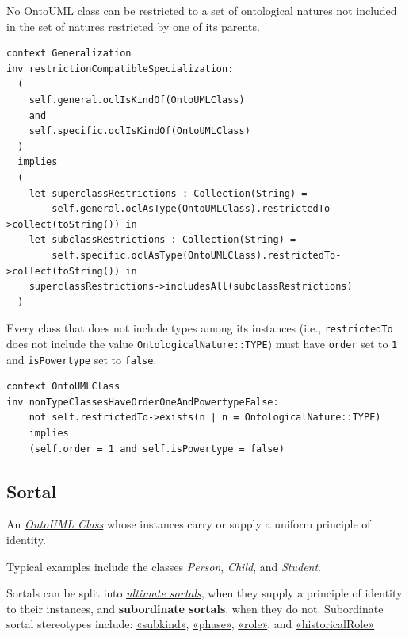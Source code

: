 \begin{constraint}
\label{restrictionCompatibleSpecialization}
No OntoUML class can be restricted to a set of ontological natures not included in the set of natures restricted by one of its parents.

\begin{lstlisting}[language=OCL]
context Generalization
inv restrictionCompatibleSpecialization:
  (
    self.general.oclIsKindOf(OntoUMLClass)
    and
    self.specific.oclIsKindOf(OntoUMLClass)
  )
  implies
  (
    let superclassRestrictions : Collection(String) = 
        self.general.oclAsType(OntoUMLClass).restrictedTo->collect(toString()) in
    let subclassRestrictions : Collection(String) = 
        self.specific.oclAsType(OntoUMLClass).restrictedTo->collect(toString()) in 
    superclassRestrictions->includesAll(subclassRestrictions)
  )
\end{lstlisting}
\end{constraint}

\begin{constraint}
\label{nonTypeClassesHaveOrderOneAndPowertypeFalse}
Every class that does not include types among its instances (i.e., \texttt{restrictedTo} does not include the value \texttt{OntologicalNature::TYPE}) must have \texttt{order} set to \texttt{1} and \texttt{isPowertype} set to \texttt{false}.

\begin{lstlisting}[language=OCL]
context OntoUMLClass
inv nonTypeClassesHaveOrderOneAndPowertypeFalse:
    not self.restrictedTo->exists(n | n = OntologicalNature::TYPE)
    implies
    (self.order = 1 and self.isPowertype = false)
\end{lstlisting}
\end{constraint}

\subsection{Sortal}
\label{stereotype:sortal}

An \hyperref[stereotype:ontoumlClass]{\textit{OntoUML Class}} whose instances carry or supply a uniform principle of identity.

Typical examples include the classes \textit{Person}, \textit{Child}, and \textit{Student}.

Sortals can be split into \hyperref[stereotype:ultimateSortal]{\textit{ultimate sortals}}, when they supply a principle of identity to their instances, and \textbf{subordinate sortals}, when they do not. Subordinate sortal stereotypes include: \hyperref[stereotype:subkind]{«subkind»}, \hyperref[stereotype:phase]{«phase»}, \hyperref[stereotype:role]{«role»}, and \hyperref[stereotype:historicalRole]{«historicalRole»} 

